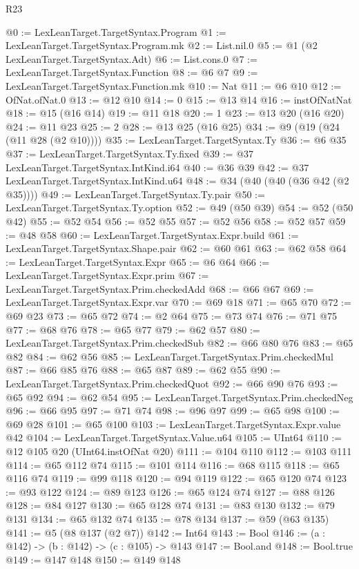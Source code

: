 \begin{lexlean}{R23}
\begin{coremodule}
{{{{{@0 := LexLeanTarget.TargetSyntax.Program
@1 := LexLeanTarget.TargetSyntax.Program.mk
@2 := List.nil.{0}
@5 := @1 (@2 LexLeanTarget.TargetSyntax.Adt)
@6 := List.cons.{0}
@7 := LexLeanTarget.TargetSyntax.Function
@8 := @6 @7
@9 := LexLeanTarget.TargetSyntax.Function.mk
@10 := Nat
@11 := @6 @10
@12 := OfNat.ofNat.{0}
@13 := @12 @10
@14 := 0
@15 := @13 @14
@16 := instOfNatNat
@18 := @15 (@16 @14)
@19 := @11 @18
@20 := 1
@23 := @13 @20 (@16 @20)
@24 := @11 @23
@25 := 2
@28 := @13 @25 (@16 @25)
@34 := @9 (@19 (@24 (@11 @28 (@2 @10))))
@35 := LexLeanTarget.TargetSyntax.Ty
@36 := @6 @35
@37 := LexLeanTarget.TargetSyntax.Ty.fixed
@39 := @37 LexLeanTarget.TargetSyntax.IntKind.i64
@40 := @36 @39
@42 := @37 LexLeanTarget.TargetSyntax.IntKind.u64
@48 := @34 (@40 (@40 (@36 @42 (@2 @35))))
@49 := LexLeanTarget.TargetSyntax.Ty.pair
@50 := LexLeanTarget.TargetSyntax.Ty.option
@52 := @49 (@50 @39)
@54 := @52 (@50 @42)
@55 := @52 @54
@56 := @52 @55
@57 := @52 @56
@58 := @52 @57
@59 := @48 @58
@60 := LexLeanTarget.TargetSyntax.Expr.build
@61 := LexLeanTarget.TargetSyntax.Shape.pair
@62 := @60 @61
@63 := @62 @58
@64 := LexLeanTarget.TargetSyntax.Expr
@65 := @6 @64
@66 := LexLeanTarget.TargetSyntax.Expr.prim
@67 := LexLeanTarget.TargetSyntax.Prim.checkedAdd
@68 := @66 @67
@69 := LexLeanTarget.TargetSyntax.Expr.var
@70 := @69 @18
@71 := @65 @70
@72 := @69 @23
@73 := @65 @72
@74 := @2 @64
@75 := @73 @74
@76 := @71 @75
@77 := @68 @76
@78 := @65 @77
@79 := @62 @57
@80 := LexLeanTarget.TargetSyntax.Prim.checkedSub
@82 := @66 @80 @76
@83 := @65 @82
@84 := @62 @56
@85 := LexLeanTarget.TargetSyntax.Prim.checkedMul
@87 := @66 @85 @76
@88 := @65 @87
@89 := @62 @55
@90 := LexLeanTarget.TargetSyntax.Prim.checkedQuot
@92 := @66 @90 @76
@93 := @65 @92
@94 := @62 @54
@95 := LexLeanTarget.TargetSyntax.Prim.checkedNeg
@96 := @66 @95
@97 := @71 @74
@98 := @96 @97
@99 := @65 @98
@100 := @69 @28
@101 := @65 @100
@103 := LexLeanTarget.TargetSyntax.Expr.value @42
@104 := LexLeanTarget.TargetSyntax.Value.u64
@105 := UInt64
@110 := @12 @105 @20 (UInt64.instOfNat @20)
@111 := @104 @110
@112 := @103 @111
@114 := @65 @112 @74
@115 := @101 @114
@116 := @68 @115
@118 := @65 @116 @74
@119 := @99 @118
@120 := @94 @119
@122 := @65 @120 @74
@123 := @93 @122
@124 := @89 @123
@126 := @65 @124 @74
@127 := @88 @126
@128 := @84 @127
@130 := @65 @128 @74
@131 := @83 @130
@132 := @79 @131
@134 := @65 @132 @74
@135 := @78 @134
@137 := @59 (@63 @135)
@141 := @5 (@8 @137 (@2 @7))
@142 := Int64
@143 := Bool
@146 := (a : @142) -> (b : @142) -> (c : @105) -> @143
@147 := Bool.and
@148 := Bool.true
@149 := @147 @148
@150 := @149 @148
}}}}}
\end{coremodule}
\end{lexlean}
